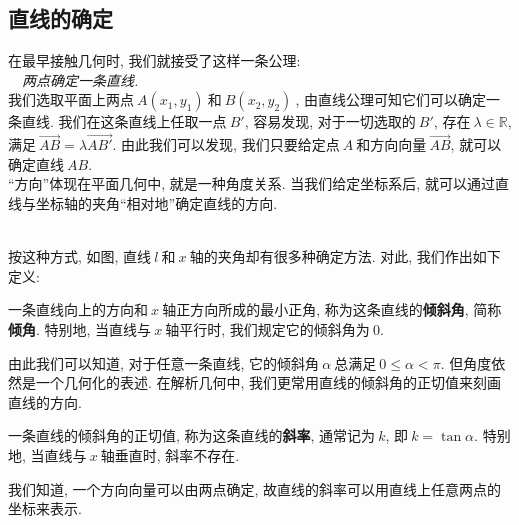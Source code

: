     \subsection{直线的确定}
    在最早接触几何时, 我们就接受了这样一条公理:\\
    \ \ {\it 两点确定一条直线.}\\
    \indent 我们选取平面上两点$\ A(x_1,y_1)\ $和$\ B(x_2,y_2)\ $, 由直线公理可知它们可以确定一条直线. 我们在这条直线上任取一点$\ B'$, 容易发现, 对于一切选取的$\ B'$, 存在$\ \lambda\in\mathbb{R}$, 满足$\ \overrightarrow{AB}=\lambda\overrightarrow{AB'}$. 由此我们可以发现, 我们只要给定点$\ A\ $和方向向量$\ \overrightarrow{AB}$, 就可以确定直线$\ AB$.\\
    \indent “方向”体现在平面几何中, 就是一种角度关系. 当我们给定坐标系后, 就可以通过直线与坐标轴的夹角“相对地”确定直线的方向.
    \begin{figure}[h]
        \centering
    \end{figure}\\
    \indent 按这种方式, 如图, 直线$\ l\ $和$\ x\ $轴的夹角却有很多种确定方法. 对此, 我们作出如下定义:
    \begin{define}
    一条直线向上的方向和$\ x\ $轴正方向所成的最小正角, 称为这条直线的{\bf 倾斜角}, 简称{\bf 倾角}. 特别地, 当直线与$\ x\ $轴平行时, 我们规定它的倾斜角为$\ 0$.
    \end{define}
    由此我们可以知道, 对于任意一条直线, 它的倾斜角$\ \alpha\ $总满足$\ 0\leq\alpha<\pi$.
    但角度依然是一个几何化的表述. 在解析几何中, 我们更常用直线的倾斜角的正切值来刻画直线的方向.
    \begin{define}
    一条直线的倾斜角的正切值, 称为这条直线的{\bf 斜率}, 通常记为$\ k$, 即$\ k=\tan \alpha$. 特别地, 当直线与$\ x\ $轴垂直时, 斜率不存在.
    \end{define}
    我们知道, 一个方向向量可以由两点确定, 故直线的斜率可以用直线上任意两点的坐标来表示.
    \begin{figure}[h]
        \centering
    \end{figure}\\
